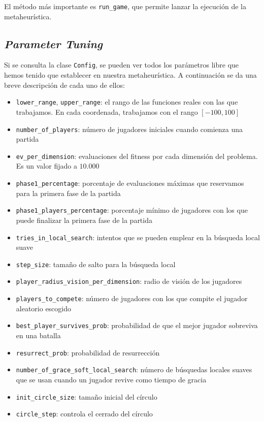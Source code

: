 \documentclass[11pt]{article}
\begin{document}
El método más importante es \lstinline{run_game}, que permite lanzar la ejecución de la metaheurística.

\subsection{\emph{Parameter Tuning}} \label{tuning}

Si se consulta la clase \lstinline{Config}, se pueden ver todos los parámetros libre que hemos tenido que establecer en nuestra metaheurística. A continuación se da una breve descripción de cada uno de ellos:

\begin{itemize}
    \item \lstinline{lower_range}, \lstinline{upper_range}: el rango de las funciones reales con las que trabajamos. En cada coordenada, trabajamos con el rango $[-100, 100]$
    \item \lstinline{number_of_players}: número de jugadores iniciales cuando comienza una partida
    \item \lstinline{ev_per_dimension}: evaluaciones del fitness por cada dimensión del problema. Es un valor fijado a $10.000$
    \item \lstinline{phase1_percentage}: porcentaje de evaluaciones máximas que reservamos para la primera fase de la partida
    \item \lstinline{phase1_players_percentage}: porcentaje mínimo de jugadores con los que puede finalizar la primera fase de la partida
    \item \lstinline{tries_in_local_search}: intentos que se pueden emplear en la búsqueda local suave
    \item \lstinline{step_size}: tamaño de salto para la búsqueda local
    \item \lstinline{player_radius_vision_per_dimension}: radio de visión de los jugadores
    \item \lstinline{players_to_compete}: número de jugadores con los que compite el jugador aleatorio escogido
    \item \lstinline{best_player_survives_prob}: probabilidad de que el mejor jugador sobreviva en una batalla
    \item \lstinline{resurrect_prob}: probabilidad de resurrección
    \item \lstinline{number_of_grace_soft_local_search}: número de búsquedas locales suaves que se usan cuando un jugador revive como tiempo de gracia
    \item \lstinline{init_circle_size}: tamaño inicial del círculo
    \item \lstinline{circle_step}: controla el cerrado del círculo
\end{itemize}
\end{document}
